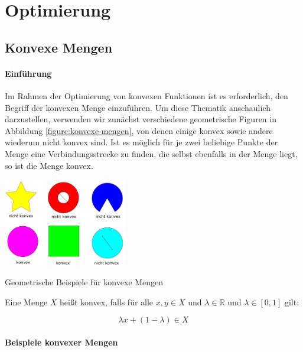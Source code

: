 \section{Optimierung}

\subsection{Konvexe Mengen}

\paragraph{Einführung}

Im Rahmen der Optimierung von konvexen Funktionen ist es erforderlich, den Begriff der konvexen Menge einzuführen. Um diese Thematik anschaulich darzustellen, verwenden wir zunächst verschiedene geometrische Figuren in Abbildung \ref{figure:konvexe-mengen}, von denen einige konvex sowie andere wiederum nicht konvex sind.
Ist es möglich für je zwei beliebige Punkte der Menge eine Verbindungsstrecke zu finden, die selbst ebenfalls in der Menge liegt, so ist die Menge konvex.

\begin{dsafigure}
\begin{center}
\label{figure:konvexe-mengen}
\includegraphics[width=0.4\textwidth]{Grafik-OptimierungLukasL_KonvexeMengen.pdf}
\caption{Geometrische Beispiele für konvexe Mengen}
\end{center}
\end{dsafigure}

\begin{Def}

Eine Menge $X$ heißt konvex, falls für alle $x, y \in X$ und $\lambda \in \mathbb{R}$ und $\lambda \in [0,1]$ gilt:

\begin{equation}
\lambda x + (1 - \lambda) \in X
\end{equation}

\end{Def}

\paragraph{Beispiele konvexer Mengen}

